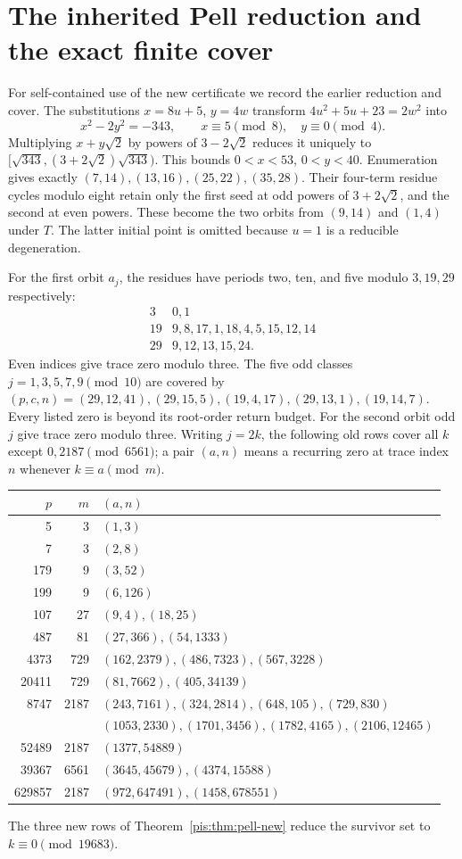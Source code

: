 \documentclass[11pt,a4paper]{article}
\theoremstyle{definition}\newtheorem{definition}[theorem]{Definition}
\theoremstyle{remark}\newtheorem{remark}[theorem]{Remark}
\begin{document}
\section{The inherited Pell reduction and the exact finite cover}
For self-contained use of the new certificate we record the earlier
reduction and cover. The substitutions $x=8u+5$, $y=4w$ transform
$4u^2+5u+23=2w^2$ into
\[
 x^2-2y^2=-343,\qquad x\equiv5\pmod8,\quad y\equiv0\pmod4.
\]
Multiplying $x+y\sqrt2$ by powers of $3-2\sqrt2$ reduces it uniquely
to $[\sqrt{343},(3+2\sqrt2)\sqrt{343})$. This bounds
$0<x<53$, $0<y<40$. Enumeration gives exactly
$(7,14),(13,16),(25,22),(35,28)$. Their four-term residue cycles
modulo eight retain only the first seed at odd powers of
$3+2\sqrt2$, and the second at even powers. These become the two
orbits from $(9,14)$ and $(1,4)$ under $T$. The latter initial point
is omitted because $u=1$ is a reducible degeneration.

For the first orbit $a_j$, the residues have periods two, ten, and
five modulo $3,19,29$ respectively:
\[
\begin{array}{c|l}
3&0,1\\
19&9,8,17,1,18,4,5,15,12,14\\
29&9,12,13,15,24.
\end{array}
\]
Even indices give trace zero modulo three. The five odd classes
$j=1,3,5,7,9\pmod{10}$ are covered by
$(p,c,n)=(29,12,41),(29,15,5),(19,4,17),(29,13,1),(19,14,7)$.
Every listed zero is beyond its root-order return budget.
For the second orbit odd $j$ give trace zero modulo three. Writing
$j=2k$, the following old rows cover all $k$ except
$0,2187\pmod{6561}$; a pair $(a,n)$ means a recurring zero at
trace index $n$ whenever $k\equiv a\pmod m$.
\begin{center}\small
\begin{tabular}{r r l}
\toprule
$p$&$m$&$(a,n)$\\\midrule
5&3&$(1,3)$\\
7&3&$(2,8)$\\
179&9&$(3,52)$\\
199&9&$(6,126)$\\
107&27&$(9,4),(18,25)$\\
487&81&$(27,366),(54,1333)$\\
4373&729&$(162,2379),(486,7323),(567,3228)$\\
20411&729&$(81,7662),(405,34139)$\\
8747&2187&$(243,7161),(324,2814),(648,105),(729,830)$\\
&&$(1053,2330),(1701,3456),(1782,4165),(2106,12465)$\\
52489&2187&$(1377,54889)$\\
39367&6561&$(3645,45679),(4374,15588)$\\
629857&2187&$(972,647491),(1458,678551)$\\
\bottomrule
\end{tabular}
\end{center}
The three new rows of Theorem~\ref{pis:thm:pell-new} reduce the survivor
set to $k\equiv0\pmod{19683}$.
\end{document}
